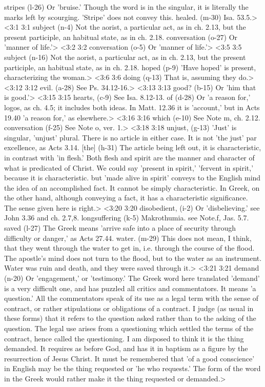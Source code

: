   stripes (l-26)  Or 'bruise.' Though the word is in the singular, it is  literally the marks left by scourging. 'Stripe' does not convey  this.
  healed. (m-30)  Isa. 53.5.>
<3:1 3:1  subject (n-4)  Not the aorist, a particular act, as in ch. 2.13, but the  present participle, an habitual state, as in ch. 2.18.
  conversation (o-27) Or 'manner of life.'>
<3:2 3:2  conversation (o-5)  Or 'manner of life.'>
<3:5 3:5  subject (n-16)  Not the aorist, a particular act, as in ch. 2.13, but the  present participle, an habitual state, as in ch. 2.18.
  hoped (p-9)  'Have hoped' is present, characterizing the woman.>
<3:6 3:6  doing (q-13)  That is, assuming they do.>
<3:12 3:12  evil. (a-28)  See Ps. 34.12-16.>
<3:13 3:13  good? (b-15)  Or 'him that is good.'>
<3:15 3:15  hearts, (c-9)  See Isa. 8.12-13.
  of (d-28)  Or 'a reason for,' logos, as ch. 4.5; it includes both  ideas. In Matt. 12.36 it is 'account,' but in Acts 19.40 'a  reason for,' as elsewhere.>
<3:16 3:16  which (e-10)  See Note m, ch. 2.12.
  conversation (f-25)  See Note o, ver. 1.>
<3:18 3:18  unjust, (g-13)  'Just' is singular, 'unjust' plural. There is no article in  either case. It is not 'the just' par excellence, as Acts 3.14.
  [the] (h-31)  The article being left out, it is characteristic, in contrast  with 'in flesh.' Both flesh and spirit are the manner and  character of what is predicated of Christ. We could say  'present in spirit,' 'fervent in spirit,' because it is  characteristic. but 'made alive in spirit' conveys to the  English mind the idea of an accomplished fact. It cannot be  simply characteristic. In Greek, on the other hand, although  conveying a fact, it has a characteristic significance. The  sense given here is right.>
<3:20 3:20  disobedient, (i-2)  Or 'disbelieving.' see John 3.36 and ch. 2.7,8.
  longsuffering (k-5)  Makrothumia. see Note.f, Jas. 5.7.
  saved (l-27)  The Greek means 'arrive safe into a place of security through  difficulty or danger,' as Acts 27.44.
  water. (m-29)  This does not mean, I think, that they went through the water  to get in, i.e. through the course of the flood. The apostle's  mind does not turn to the flood, but to the water as an  instrument. Water was ruin and death, and they were saved  through it.>
<3:21 3:21  demand (n-20)  Or 'engagement,' or 'testimony.' The Greek word here  translated 'demand' is a very difficult one, and has puzzled  all critics and commentators. It means 'a question.' All the  commentators speak of its use as a legal term with the sense of  contract, or rather stipulations or obligations of a contract.  I judge (as usual in these forms) that it refers to the  question asked rather than to the asking of the question. The  legal use arises from a questioning which settled the terms of  the contract, hence called the questioning. I am disposed to  think it is the thing demanded. It requires as before God, and  has it in baptism as a figure by the resurrection of Jesus  Christ. It must be remembered that 'of a good conscience' in  English may be the thing requested or 'he who requests.' The  form of the word in the Greek would rather make it the thing  requested or demanded.>
